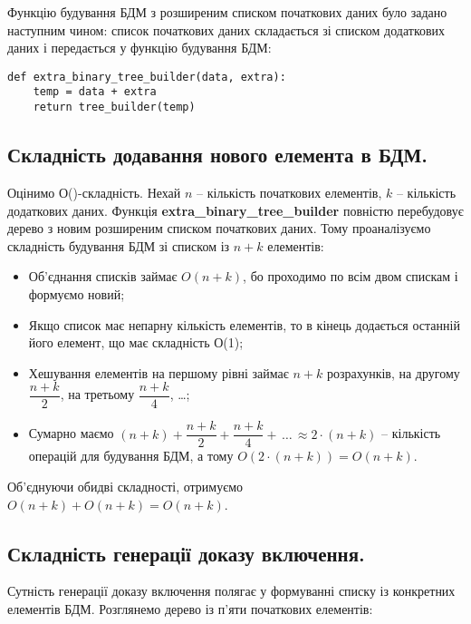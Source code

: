 \documentclass[a4paper, 12pt]{article}
\begin{document}
\par Функцію будування БДМ з розширеним списком початкових даних було задано наступним чином: список початкових даних складається зі списком додаткових даних і передається у функцію будування БДМ:
 
\begin{lstlisting}
def extra_binary_tree_builder(data, extra):
	temp = data + extra
	return tree_builder(temp)
\end{lstlisting}

\subsection{Складність додавання нового елемента в БДМ.}

\par Оцінимо О()-складність. Нехай $n$ -- кількість початкових елементів, $k$ -- кількість додаткових даних. Функція \textbf{extra\_binary\_tree\_builder} повністю перебудовує дерево з новим розширеним списком початкових даних. Тому проаналізуємо складність будування БДМ зі списком із $n + k$ елементів:

\begin{itemize}
	\item Об'єднання списків займає $O(n + k)$, бо проходимо по всім двом спискам і формуємо новий;
	\item Якщо список має непарну кількість елементів, то в кінець додається останній його елемент, що має складність О(1);
	\item Хешування елементів на першому рівні займає $n + k$ розрахунків, на другому $\dfrac {n + k}2$, на третьому $\dfrac {n + k}4$, \dots;
	\item Сумарно маємо $(n + k) + \dfrac {n + k}2 + \dfrac {n + k}4 + \, \dots \, \approx 2 \cdot (n + k)$ -- кількість операцій для будування БДМ, а тому $O(2 \cdot (n + k)) = O(n + k)$.
\end{itemize}
\par Об'єднуючи обидві складності, отримуємо $O(n + k) + O(n + k) = O(n + k)$.
 
\subsection{Складність генерації доказу включення.}

\par Сутність генерації доказу включення полягає у формуванні списку із конкретних елементів БДМ. Розглянемо дерево із п'яти початкових елементів:
\end{document}
